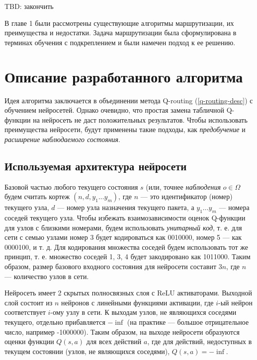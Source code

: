 \documentclass[specification, annotation]{itmo-student-thesis}
\begin{document}
TBD: закончить

\chapterconclusion

В главе 1 были рассмотрены существующие алгоритмы маршрутизации, их преимущества
и недостатки. Задача маршрутизации была сформулирована в терминах обучения с
подкреплением и были намечен подход к ее решению.

\chapter{Описание разработанного алгоритма}

Идея алгоритма заключается в объединении метода Q-routing (\ref{q-routing-desc}) с обучением
нейросетей. Однако очевидно, что простая замена табличной Q-функции на нейросеть
не даст положительных результатов. Чтобы использовать преимущества
нейросети, будут применены такие подходы, как \textit{предобучение} и
\textit{расширение наблюдаемого состояния}.

\section{Используемая архитектура нейросети}

Базовой частью любого текущего состояния $s$ (или, точнее \textit{наблюдения}
$o \in \Omega$ будем считать кортеж $(n, d, y_1 ... y_m)$, где $n$ --- это
идентификатор (номер) текущего узла, $d$ --- номер узла назначения текущего
пакета, а $y_1 ... y_m$ --- номера соседей текущего узла. Чтобы избежать
взаимозависимости оценок Q-функции для узлов с близкими номерами, будем
использовать \textit{унитарный код}, т. е. для сети с семью узлами номер 3 будет
кодироваться как 0010000, номер 5 --- как 0000100, и т. д. Для кодирования
множества соседей будем использовать тот же принцип, т. е. множество соседей 1,
3, 4 будет закодировано как 1011000. Таким образом, размер базового входного
состояния для нейросети составит $3n$, где $n$ --- количество узлов в сети.

Нейросеть имеет 2 скрытых полносвязных слоя с ReLU активаторами. Выходной слой
состоит из $n$ нейронов с линейными функциями активации, где $i$-ый нейрон
соответствует $i$-ому узлу в сети. К выходам узлов, не являющихся соседями
текущего, отдельно прибавляется $-\inf$ (на практике --- большое отрицательное
число, например -1000000). Таким образом, на выходе нейросети образуются оценки
функции $Q(s, a)$ для всех действий $a$, где для действий, недоступных в текущем
состоянии (узлов, не являющихся соседями), $Q(s, a) = -\inf$.
\end{document}
